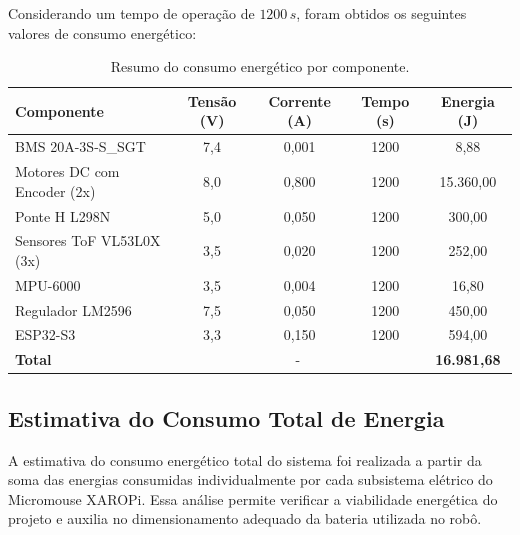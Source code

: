 Considerando um tempo de operação de $1200\,s$, foram obtidos os seguintes valores de consumo energético:

\begin{table}[H]
    \centering
    \small
    \begin{tabular}{|l|c|c|c|c|}
        \hline
        
        \textbf{Componente} & \textbf{Tensão (V)} & \textbf{Corrente (A)} & \textbf{Tempo (s)} & \textbf{Energia (J)} \\ \hline
        
        BMS 20A-3S-S\_SGT & 7,4 & 0,001 & 1200 & 8,88 \\ \hline
        
        Motores DC com Encoder (2x) & 8,0 & 0,800 & 1200 & 15.360,00 \\ \hline
        
        Ponte H L298N & 5,0 & 0,050 & 1200 & 300,00 \\ \hline
        
        Sensores ToF VL53L0X (3x) & 3,5 & 0,020 & 1200 & 252,00 \\ \hline
        
        MPU-6000 & 3,5 & 0,004 & 1200 & 16,80 \\ \hline
        
        Regulador LM2596 & 7,5 & 0,050 & 1200 & 450,00 \\ \hline
        
        ESP32-S3 & 3,3 & 0,150 & 1200 & 594,00 \\ \hline
        
        \textbf{Total} & \multicolumn{3}{c|}{-} & \textbf{16.981,68} \\ \hline
        
    \end{tabular}
    
    \caption{Resumo do consumo energético por componente.}
    \label{tab:energia_componentes}
\end{table}

\subsection{Estimativa do Consumo Total de Energia}

A estimativa do consumo energético total do sistema foi realizada a partir da soma das energias consumidas individualmente por cada subsistema elétrico do Micromouse XAROPi. Essa análise permite verificar a viabilidade energética do projeto e auxilia no dimensionamento adequado da bateria utilizada no robô.

